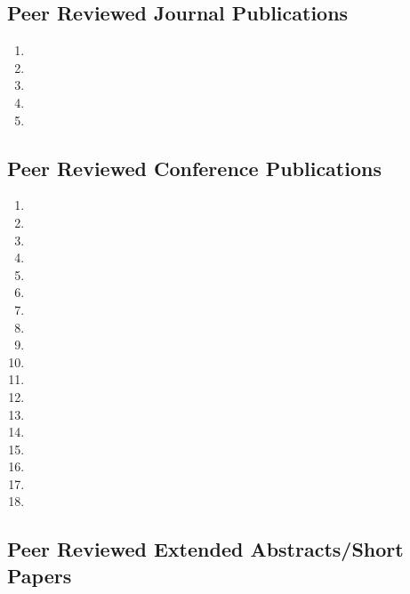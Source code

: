 
\hypertarget{peer-reviewed-journal-publications}{%
\subsection{Peer Reviewed Journal
Publications}\label{peer-reviewed-journal-publications}}

\begin{enumerate}
\tightlist
\item {}
\item {}
\item {}
\item {}
\item {}
\end{enumerate}

\hypertarget{peer-reviewed-conference-publications}{%
\subsection{Peer Reviewed Conference
Publications}\label{peer-reviewed-conference-publications}}

\begin{enumerate}[resume]
\tightlist
\item {}
\item {}
\item {}
\item {}
\item {}
\item {}
\item {}
\item {}
\item {}
\item {}
\item {}
\item {}
\item {}
\item {}
\item {}
\item {}
\item {}
\item {}
\end{enumerate}

\hypertarget{peer-reviewed-extended-abstractsshort-papers}{%
\subsection{Peer Reviewed Extended Abstracts/Short
Papers}\label{peer-reviewed-extended-abstractsshort-papers}}

